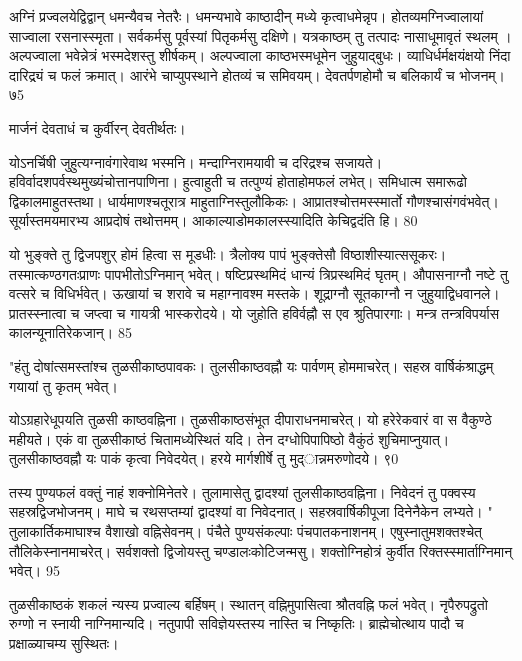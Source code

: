   अग्निं प्रज्वलयेद्विद्वान् धमन्यैवच नेतरैः।
 धमन्यभावे काष्ठादीन् मध्ये कृत्वाधमेन्नृप।
 होतव्यमग्निज्वालायां साज्वाला रसनास्स्मृता।
 सर्वकर्मसु पूर्वस्यां पितृकर्मसु दक्षिणे।
 यत्रकाष्ठम् तु तत्पादः नासाधूमावृतं स्थलम् ।
 अल्पज्वाला भवेन्नेत्रं भस्मदेशस्तु शीर्षकम्।
 अल्पज्वाला काष्ठभस्मधूमेन जुहुयाद्बुधः।
 व्याधिर्धर्मक्षयंक्षयो निंदा दारिद्र्यं च फलं क्रमात्।
 आरंभे चाप्युपस्थाने होतव्यं च समिवयम्।
 देवतर्पणहोमौ च बलिकार्यं च भोजनम्।
 ७5

  मार्जनं देवताधं च कुर्वीरन् देवतीर्थतः।

योऽनर्चिषी जुहुत्यग्नावंगारेवाथ भस्मनि।
 मन्दाग्निरामयावी च दरिद्रश्च सजायते।
 हविर्वादशपर्वस्थमुख्यंचोत्तानपाणिना।
 हुत्वाहुती च तत्पुण्यं होताहोमफलं लभेत्।
 समिधात्म समारूढो द्विकालमाहुतस्तथा।
 धार्यमाणश्चतूरात्र माहुताग्निस्तुलौकिकः।
 आप्रातश्चोत्तमस्स्मार्तो गौणश्चासंगवंभवेत्।
 सूर्यास्तमयमारभ्य आप्रदोषं तथोत्तमम्।
 आकाल्याडोमकालस्स्यादिति केचिद्वदंति हि।
 80

  यो भुङ्क्ते तु द्विजपशुर् होमं हित्वा स मूडधीः।
 त्रैलोक्य पापं भुङ्क्तेसौ विष्ठाशीस्यात्ससूकरः।
 तस्मात्कण्ठगतःप्राणः पापभीतोऽग्निमान् भवेत्।
 षष्टिप्रस्थमिदं धान्यं त्रिप्रस्थमिदं घृतम्।
 औपासनाग्नौ नष्टे तु वत्सरे च विधिर्भवेत्।
 ऊखायां च शरावे च महाग्नावश्म मस्तके।
 शूद्राग्नौ सूतकाग्नौ न जुहुयाद्विधवानले।
 प्रातस्स्नात्वा च जप्त्वा च गायत्री भास्करोदये।
 यो जुहोति हविर्वह्नौ स एव श्रुतिपारगाः।
 मन्त्र तन्त्रविपर्यास कालन्यूनातिरेकजान्।
 85

  "हंतु दोषांत्समस्तांश्च तुळसीकाष्ठपावकः।
 तुलसीकाष्ठवह्नौ यः पार्वणम् होममाचरेत्।
 सहस्र वार्षिकंश्राद्धम् गयायां तु कृतम् भवेत्।
 
योऽग्रहारेधूपयति तुळसी काष्ठवह्निना।
 तुळसीकाष्ठसंभूत दीपाराधनमाचरेत्।
 यो हरेरेकवारं वा स वैकुण्ठे महीयते।
 एकं वा तुळसीकाष्ठं चितामध्येस्थितं यदि।
 तेन दग्धोपिपापिष्ठो वैकुंठं शुचिमाप्नुयात्।
 तुलसीकाष्ठवह्नौ यः पाकं कृत्वा निवेदयेत्।
 हरये मार्गशीर्षे तु मुद्ान्नमरुणोदये।
 ९0

  तस्य पुण्यफलं वक्तुं नाहं शक्नोमिनेतरे।
 तुलामासेतु द्वादश्यां तुलसीकाष्ठवह्निना।
 निवेदनं तु पक्वस्य सहस्रद्विजभोजनम्।
 माघे च रथसप्तम्यां द्वादश्यां वा निवेदनात्।
 सहस्रवार्षिकीपूजा दिनेनैकेन लभ्यते।
 " तुलाकार्तिकमाघाश्च वैशाखो वह्निसेवनम्।
 पंचैते पुण्यसंकल्पाः पंचपातकनाशनम्।
 एषुस्नातुमशक्तश्चेत् तौलिकेस्नानमाचरेत्।
 सर्वशक्तो द्विजोयस्तु चण्डालःकोटिजन्मसु।
 शक्तोग्निहोत्रं कुर्वीत रिक्तस्स्मार्ताग्निमान् भवेत्।
 95

  तुळसीकाष्ठकं शकलं न्यस्य प्रज्वाल्य बर्हिषम्।
 स्थातन् वह्निमुपासित्वा श्रौतवह्नि फलं भवेत्।
 नृपैरुपद्रुतो रुग्णो न स्नायी नाग्निमान्यदि।
 नतुपापी सविज्ञेयस्तस्य नास्ति च निष्कृतिः।
 ब्राह्मेचोत्थाय पादौ च प्रक्षाळ्याचम्य सुस्थितः।
 
